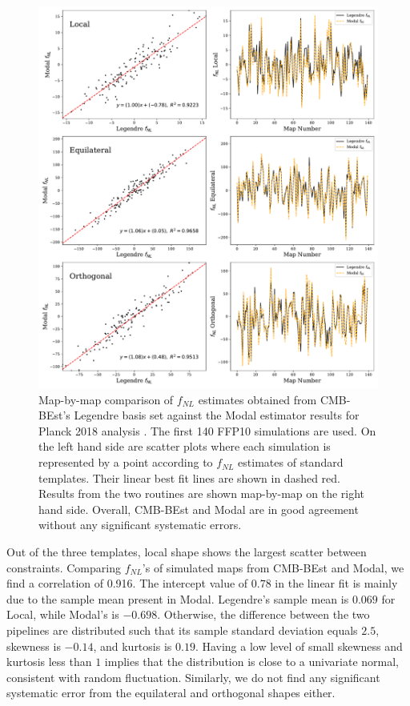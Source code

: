 \begin{figure}[htbp!] 
	\centering    
	\includegraphics[width=\textwidth]{map_by_map_Legendre_Modal.pdf}
	\caption{Map-by-map comparison of $f_{NL}$ estimates obtained from CMB-BEst's Legendre basis set against the Modal estimator results for Planck 2018 analysis \cite{PlanckCollaboration2018}. The first 140 FFP10 simulations are used. On the left hand side are scatter plots where each simulation is represented by a point according to $f_{NL}$ estimates of standard templates. Their linear best fit lines are shown in dashed red. Results from the two routines are shown map-by-map on the right hand side. Overall, CMB-BEst and Modal are in good agreement without any significant systematic errors.}
	\label{fig:map_by_map_Legendre_Modal}
\end{figure}

Out of the three templates, local shape shows the largest scatter between constraints. Comparing $f_{NL}$'s of simulated maps from CMB-BEst and Modal, we find a correlation of 0.916. The intercept value of $0.78$ in the linear fit is mainly due to the sample mean present in Modal. Legendre's sample mean is $0.069$ for Local, while Modal's is $-0.698$. Otherwise, the difference between the two pipelines are distributed such that its sample standard deviation equals $2.5$, skewness is $-0.14$, and kurtosis is $0.19$. Having a low level of small skewness and kurtosis less than $1$ implies that the distribution is close to a univariate normal, consistent with random fluctuation. Similarly, we do not find any significant systematic error from the equilateral and orthogonal shapes either.

